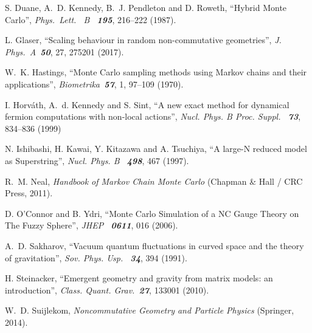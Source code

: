 \documentclass[12pt,a4paper]{article}
\begin{document}
\begin{thebibliography}{99}
S. Duane, A.~D. Kennedy, B.~J. Pendleton and D. Roweth,
``Hybrid Monte Carlo'',
{\it Phys.\ Lett. \ B \ \bf 195}, 216--222 (1987).

L. Glaser,
``Scaling behaviour in random non-commutative geometries'',
{\it J. Phys.\ A\ \bf 50}, 27, 275201 (2017).

W.~K. Hastings,
``Monte  Carlo sampling  methods using  Markov chains  and their applications'',
{\it Biometrika\ \bf 57}, 1, 97--109 (1970).

I. Horv\'{a}th, A.~d. Kennedy and S. Sint,
``A new exact method for dynamical fermion computations with non-local actions'',
{\it Nucl. Phys. B Proc. Suppl. \ \bf 73}, 834--836 (1999)

N. Ishibashi, H. Kawai, Y. Kitazawa and A. Tsuchiya,
``A large-N reduced model as Superstring'',
{\it Nucl. Phys. B \ \bf 498}, 467 (1997).

R.~M. Neal,
{\it Handbook of Markov Chain Monte Carlo\/}
(Chapman \& Hall / CRC Press, 2011).

D. O’Connor and B. Ydri,
``Monte Carlo Simulation of a NC Gauge Theory on The Fuzzy Sphere'',
{\it JHEP \ \bf 0611}, 016 (2006).

A.~D. Sakharov,
``Vacuum quantum fluctuations in curved space and the theory of gravitation'',
{\it Sov. Phys. Usp. \ \bf 34}, 394 (1991).

H. Steinacker,
``Emergent geometry and gravity from matrix models: an introduction'',
{\it Class. Quant. Grav.\ \bf 27}, 133001 (2010).

W.~D. Suijlekom,
{\it Noncommutative Geometry and Particle Physics\/}
(Springer, 2014).






 
 
\end{thebibliography}
\end{document}
